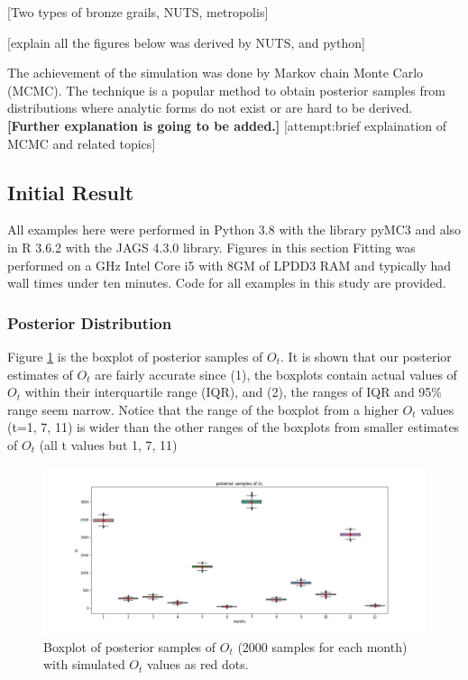 \documentclass[12pt]{article}
\begin{document}
{[Two types of bronze grails, NUTS, metropolis]

[explain all the figures below was derived by NUTS, and python]

The achievement of the simulation was done by Markov chain Monte Carlo (MCMC). The technique is a popular method to obtain posterior samples from distributions where analytic forms do not exist or are hard to be derived. \textbf{[Further explanation is going to be added.]} [attempt:brief explaination of MCMC and related topics]

\subsection{Initial Result} 

All examples here were performed in Python 3.8 with the library pyMC3 \cite{pymc3} and also in  R 3.6.2 \cite{r_lan} with the JAGS 4.3.0\cite{jags} library. Figures in this section Fitting was performed on a GHz Intel Core i5 with 8GM of LPDD3 RAM and typically had wall times under ten minutes. Code for all examples in this study are provided. 

\subsubsection{Posterior Distribution}


Figure \ref{pst_ot} is the boxplot of posterior samples of $O_t$. It is shown that our posterior estimates of  $O_t$ are fairly accurate since (1), the boxplots contain actual values of $O_t$ within their interquartile range (IQR), and (2), the ranges of IQR and 95\% range seem narrow. Notice that the range of the boxplot from a higher $O_t$ values (t=1, 7, 11) is wider than the other ranges of the boxplots from smaller estimates of $O_t$ (all t values but 1, 7, 11)\\

\begin{figure}[h]
	\centering
	\includegraphics[width=1\linewidth]{Figures/earlyresult1_ot.png}
	\caption{Boxplot of posterior samples of $O_t$ (2000 samples for each month) with simulated $O_t$ values as red dots.}
	\label{pst_ot}
\end{figure}

}
\end{document}
